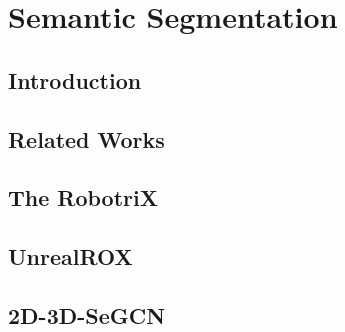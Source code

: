 \chapter{Semantic Segmentation}
\label{cha:semseg}

\section{Introduction}
\label{cha:semseg:sec:introduction}

\section{Related Works}
\label{cha:semseg:sec:relatedworks}

\section{The RobotriX}
\label{cha:semseg:sec:robotrix}

\section{UnrealROX}
\label{cha:semseg:sec:unrealrox}

\section{2D-3D-SeGCN}
\label{cha:semseg:sec:2d3dsegcn}
